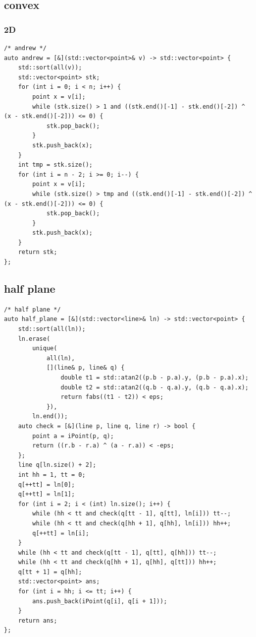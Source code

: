 \documentclass[UTF8, a4paper, titlepage, twoside]{ctexart}
\begin{document}
\subsection{ convex }
\subsubsection*{ 2D }
\begin{lstlisting}[style=cpp]
/* andrew */
auto andrew = [&](std::vector<point>& v) -> std::vector<point> {
    std::sort(all(v));
    std::vector<point> stk;
    for (int i = 0; i < n; i++) {
        point x = v[i];
        while (stk.size() > 1 and ((stk.end()[-1] - stk.end()[-2]) ^ (x - stk.end()[-2])) <= 0) {
            stk.pop_back();
        }
        stk.push_back(x);
    }
    int tmp = stk.size();
    for (int i = n - 2; i >= 0; i--) {
        point x = v[i];
        while (stk.size() > tmp and ((stk.end()[-1] - stk.end()[-2]) ^ (x - stk.end()[-2])) <= 0) {
            stk.pop_back();
        }
        stk.push_back(x);
    }
    return stk;
};
\end{lstlisting}

\subsection*{ half plane }
\begin{lstlisting}[style=cpp]
/* half plane */
auto half_plane = [&](std::vector<line>& ln) -> std::vector<point> {
    std::sort(all(ln));
    ln.erase(
        unique(
            all(ln),
            [](line& p, line& q) {
                double t1 = std::atan2((p.b - p.a).y, (p.b - p.a).x);
                double t2 = std::atan2((q.b - q.a).y, (q.b - q.a).x);
                return fabs((t1 - t2)) < eps;
            }),
        ln.end());
    auto check = [&](line p, line q, line r) -> bool {
        point a = iPoint(p, q);
        return ((r.b - r.a) ^ (a - r.a)) < -eps;
    };
    line q[ln.size() + 2];
    int hh = 1, tt = 0;
    q[++tt] = ln[0];
    q[++tt] = ln[1];
    for (int i = 2; i < (int) ln.size(); i++) {
        while (hh < tt and check(q[tt - 1], q[tt], ln[i])) tt--;
        while (hh < tt and check(q[hh + 1], q[hh], ln[i])) hh++;
        q[++tt] = ln[i];
    }
    while (hh < tt and check(q[tt - 1], q[tt], q[hh])) tt--;
    while (hh < tt and check(q[hh + 1], q[hh], q[tt])) hh++;
    q[tt + 1] = q[hh];
    std::vector<point> ans;
    for (int i = hh; i <= tt; i++) {
        ans.push_back(iPoint(q[i], q[i + 1]));
    }
    return ans;
};
\end{lstlisting}
\end{document}
